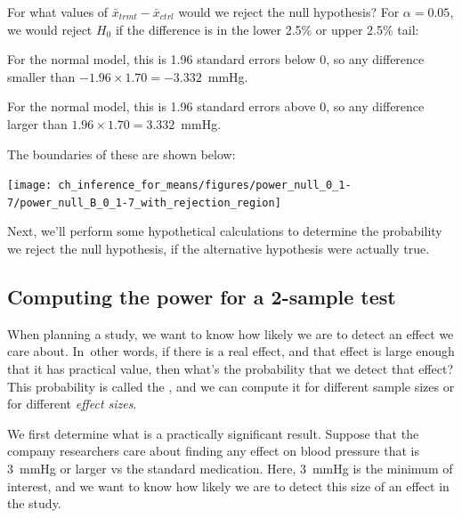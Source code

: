 \begin{examplewrap}
\begin{nexample}{For what values of $\bar{x}_{trmt} - \bar{x}_{ctrl}$ would we reject the null hypothesis?}
For $\alpha = 0.05$, we would reject $H_0$ if the difference is in the lower 2.5\% or upper 2.5\% tail:
\begin{description}
\setlength{\itemsep}{0mm}
\item[Lower 2.5\%:] For the normal model, this is 1.96 standard errors below 0, so any difference smaller than $-1.96 \times 1.70 = -3.332$~mmHg.
\item[Upper 2.5\%:] For the normal model, this is 1.96 standard errors above 0, so any difference larger than $1.96 \times 1.70 = 3.332$~mmHg.
\end{description}
The boundaries of these  are shown below:
\begin{center}
\texttt{[image: ch\_inference\_for\_means/figures/power\_null\_0\_1-7/power\_null\_B\_0\_1-7\_with\_rejection\_region]}
\end{center}
\end{nexample}
\end{examplewrap}

Next, we'll perform some hypothetical calculations to determine the probability we reject the null hypothesis, if the alternative hypothesis were actually true.


\subsection{Computing the power for a 2-sample test}

When planning a study, we want to know how likely we are to detect an effect we care about. In~other words, if there is a real effect, and that effect is large enough that it has practical value, then what's the probability that we detect that effect? This probability is called the , and we can compute it for different sample sizes or for different \emph{effect sizes}.

We first determine what is a practically significant result. Suppose that the company researchers care about finding any effect on blood pressure that is 3~mmHg or larger vs the standard medication. Here, 3~mmHg is the minimum  of interest, and we want to know how likely we are to detect this size of an effect in the study.


